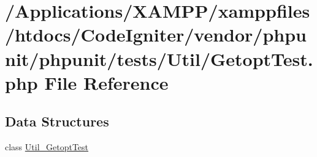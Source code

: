 \hypertarget{_getopt_test_8php}{}\section{/\+Applications/\+X\+A\+M\+P\+P/xamppfiles/htdocs/\+Code\+Igniter/vendor/phpunit/phpunit/tests/\+Util/\+Getopt\+Test.php File Reference}
\label{_getopt_test_8php}
\subsection*{Data Structures}
\begin{DoxyCompactItemize}
\item 
class \mbox{\hyperlink{class_util___getopt_test}{Util\+\_\+\+Getopt\+Test}}
\end{DoxyCompactItemize}
